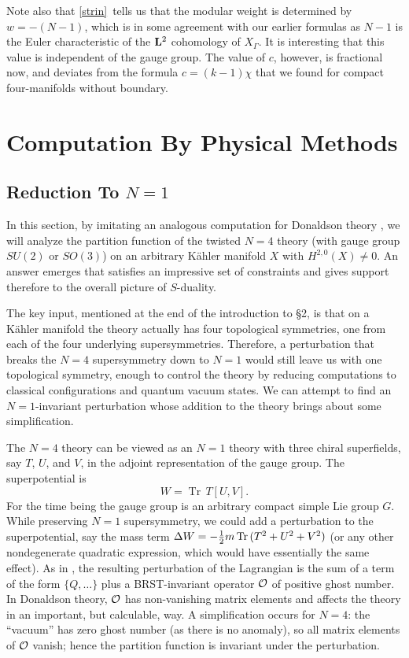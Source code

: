 \documentclass[12pt]{article}
\numberwithin{equation}{section}
\DeclareMathOperator{\Tr}{Tr}
\begin{document}
Note also that \eqref{strin}\ tells
us that the modular weight is determined by
$w=-(N-1)$, which is in some agreement with our earlier formulas
as $N-1$ is the Euler characteristic of the ${\bf L}^2$ cohomology
of $X_\Gamma$.  It is interesting that this value is independent
of the gauge group.
The value of $c$, however, is fractional now, and
deviates from the formula $c=(k-1)\chi$ that we found for compact
four-manifolds without boundary.

\section{Computation By Physical Methods}

\subsection{Reduction To \texorpdfstring{$N=1$}{N=1}}

In this section, by imitating an analogous computation for Donaldson
theory \cite{switten}, we will analyze the partition function of the
twisted $N=4$ theory (with gauge group $SU(2)$ or $SO(3)$)
on an arbitrary K\"ahler manifold $X$ with
$H^{2,0}(X)\not= 0$. An answer emerges that satisfies an impressive
set of constraints and gives support therefore to the overall picture
of $S$-duality.

The key input, mentioned at the end of the introduction to
\S2, is that on a K\"ahler
manifold the theory actually has four topological symmetries, one
from each of the four underlying supersymmetries.  Therefore, a perturbation
that breaks the $N=4$ supersymmetry down to $N=1$ would still leave
us with one topological symmetry, enough to control the theory
by reducing computations to classical configurations and quantum
vacuum states.  We can attempt to find an $N=1$-invariant perturbation whose
addition to the theory brings about some simplification.

The $N=4$ theory can be viewed as an $N=1$ theory with three chiral
superfields, say $T$, $U$, and $V$, in the adjoint representation of
the gauge group.
The superpotential is
\begin{equation}
  \label{wis}
  W= \Tr \,T[U,V].
\end{equation}
For the time being the gauge group is an arbitrary compact simple
Lie group $G$.
While preserving $N=1$ supersymmetry, we could add a perturbation to
the superpotential, say the mass term
$\Delta W =- {1\over 2}m\Tr \,(T^2+U^2+V^2)$ (or any other nondegenerate
quadratic expression, which would have essentially the same effect).
As in \cite{switten}, the  resulting
perturbation of the Lagrangian
is the sum of a term of the form $\{Q,\dots\}$ plus a BRST-invariant operator
${\cal O}$ of positive ghost number.  In Donaldson theory, ${\cal O}$
has non-vanishing
matrix elements and affects the theory in an important, but calculable,
way.  A simplification occurs for $N=4$: the ``vacuum'' has zero ghost
number (as there is no anomaly), so all matrix elements of ${\cal O}$ vanish;
hence the partition function is invariant under the perturbation.
\end{document}
